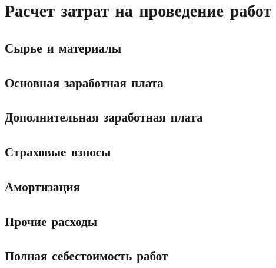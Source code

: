\section{Расчет затрат на проведение работ}

\subsection{Сырье и материалы}

\subsection{Основная заработная плата}

\subsection{Дополнительная заработная плата}

\subsection{Страховые взносы}

\subsection{Амортизация}

\subsection{Прочие расходы}

\subsection{Полная себестоимость работ}

